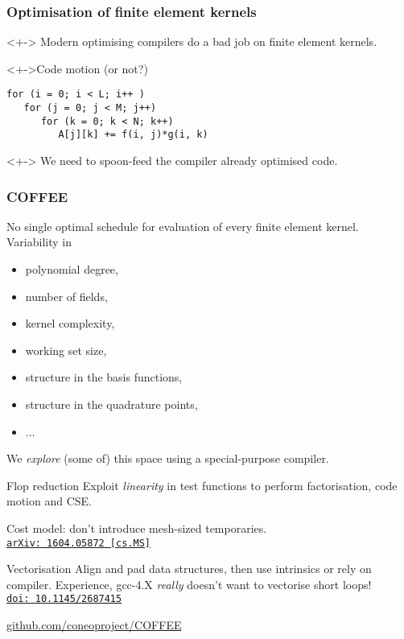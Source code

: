 \documentclass[presentation]{beamer}
\newcommand{\arxivlink}[2]{%
  \href{http://www.arxiv.org/abs/#1}%
  {{\small\texttt{arXiv:\,#1\,[#2]}}}%
}
\newcommand{\doilink}[1]{%
  \href{http://dx.doi.org/#1}%
  {{\small\texttt{doi:\,#1}{}}}%
}
\begin{document}
\begin{frame}[fragile]
  \frametitle{Optimisation of finite element kernels}
  
  \begin{problem}<+->
    Modern optimising compilers do a bad job on finite element
    kernels.
  \end{problem}
  \begin{exampleblock}<+->{Code motion (or not?)}
\begin{verbatim}
for (i = 0; i < L; i++ )
   for (j = 0; j < M; j++)
      for (k = 0; k < N; k++)
         A[j][k] += f(i, j)*g(i, k)
\end{verbatim}
  \end{exampleblock}
  \begin{corollary}<+->
    We need to spoon-feed the compiler already optimised code.
  \end{corollary}
\end{frame}
\begin{frame}[allowframebreaks]
  \frametitle{COFFEE}

  No single optimal schedule for evaluation of every finite element
  kernel.  Variability in
  \begin{itemize}
  \item polynomial degree,
  \item number of fields,
  \item kernel complexity,
  \item working set size,
  \item structure in the basis functions,
  \item structure in the quadrature points,
  \item ...
  \end{itemize}
  We \emph{explore} (some of) this space using a special-purpose
  compiler.

\pagebreak

\begin{block}{Flop reduction}
  Exploit \emph{linearity} in test functions to perform factorisation,
  code motion and CSE.  

Cost model: don't introduce mesh-sized
  temporaries.\\
  \cite{Luporini:2016} \arxivlink{1604.05872}{cs.MS}
\end{block}

\begin{block}{Vectorisation}
  Align and pad data structures, then use intrinsics or rely on
  compiler.  Experience, gcc-4.X \emph{really} doesn't want to
  vectorise short loops!\\
  \cite{Luporini:2015} \doilink{10.1145/2687415}
\end{block}
\begin{center}
  \url{github.com/coneoproject/COFFEE}
\end{center}
\end{frame}
\end{document}
